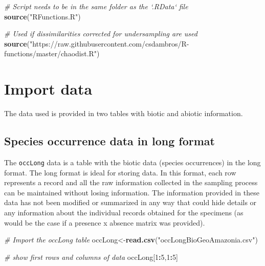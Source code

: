 \documentclass[]{article}
\newenvironment{Shaded}{\begin{snugshade}}{\end{snugshade}}
\newcommand{\CommentTok}[1]{\textcolor[rgb]{0.56,0.35,0.01}{\textit{#1}}}
\newcommand{\DecValTok}[1]{\textcolor[rgb]{0.00,0.00,0.81}{#1}}
\newcommand{\KeywordTok}[1]{\textcolor[rgb]{0.13,0.29,0.53}{\textbf{#1}}}
\newcommand{\NormalTok}[1]{#1}
\newcommand{\OperatorTok}[1]{\textcolor[rgb]{0.81,0.36,0.00}{\textbf{#1}}}
\newcommand{\StringTok}[1]{\textcolor[rgb]{0.31,0.60,0.02}{#1}}
\begin{document}
\begin{Shaded}
\begin{Highlighting}[]
\CommentTok{# Script needs to be in the same folder as the `.RData` file}
\KeywordTok{source}\NormalTok{(}\StringTok{"RFunctions.R"}\NormalTok{) }

\CommentTok{# Used if dissimilarities corrected for undersampling are used}
\KeywordTok{source}\NormalTok{(}\StringTok{"https://raw.githubusercontent.com/csdambros/R-functions/master/chaodist.R"}\NormalTok{) }
\end{Highlighting}
\end{Shaded}

\hypertarget{import-data}{%
\section{Import data}\label{import-data}}

The data used is provided in two tables with biotic and abiotic
information.

\hypertarget{species-occurrence-data-in-long-format}{%
\subsection{Species occurrence data in long
format}\label{species-occurrence-data-in-long-format}}

The \texttt{occLong} data is a table with the biotic data (species
occurrences) in the long format. The long format is ideal for storing
data. In this format, each row represents a record and all the raw
information collected in the sampling process can be maintained without
losing information. The information provided in these data has not been
modified or summarized in any way that could hide details or any
information about the individual records obtained for the specimens (as
would be the case if a presence x absence matrix was provided).

\begin{Shaded}
\begin{Highlighting}[]
\CommentTok{# Import the occLong table}
\NormalTok{occLong<-}\KeywordTok{read.csv}\NormalTok{(}\StringTok{"occLongBioGeoAmazonia.csv"}\NormalTok{)}

\CommentTok{# show first rows and columns of data}
\NormalTok{occLong[}\DecValTok{1}\OperatorTok{:}\DecValTok{5}\NormalTok{,}\DecValTok{1}\OperatorTok{:}\DecValTok{5}\NormalTok{]}
\end{Highlighting}
\end{Shaded}
\end{document}
